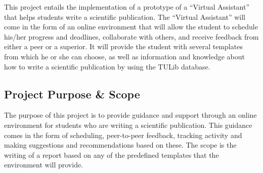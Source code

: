 This project entails the implementation of a prototype of a ``Virtual Assistant'' that helps students write a scientific publication.
The ``Virtual Assistant'' will come in the form of an online environment that will allow the student to schedule his/her progress 
and deadlines, collaborate with others, and receive feedback from either a peer or a superior. 
It will provide the student with several templates from which he or she can choose, as well as information and knowledge
about how to write a scientific publication by using the TULib database.

\subsection{Project Purpose \& Scope} %
\label{sub:project_purpose_&_scope}
The purpose of this project is to provide guidance and support through an online environment for students who are
writing a scientific publication. This guidance comes in the form of scheduling, peer-to-peer feedback, tracking activity and 
making suggestions and recommendations based on these. The scope is the writing of a report based on any of the predefined templates that 
the environment will provide.
